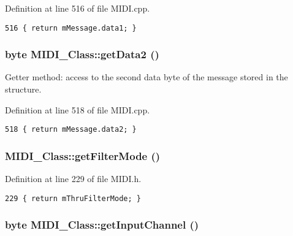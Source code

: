 Definition at line 516 of file MIDI.cpp.

\begin{Code}\begin{verbatim}516 { return mMessage.data1; }
\end{verbatim}
\end{Code}


\hypertarget{class_m_i_d_i___class_688f4f57142f1a7dfd1a79bf43e1b74d}{
\subsubsection[{getData2}]{\setlength{\rightskip}{0pt plus 5cm}byte MIDI\_\-Class::getData2 ()}}
\label{class_m_i_d_i___class_688f4f57142f1a7dfd1a79bf43e1b74d}


Getter method: access to the second data byte of the message stored in the structure. 

Definition at line 518 of file MIDI.cpp.

\begin{Code}\begin{verbatim}518 { return mMessage.data2; }
\end{verbatim}
\end{Code}


\hypertarget{class_m_i_d_i___class_8952fc757cefe98856ba7cfc811bbbb3}{
\subsubsection[{getFilterMode}]{ MIDI\_\-Class::getFilterMode ()}}
\label{class_m_i_d_i___class_8952fc757cefe98856ba7cfc811bbbb3}




Definition at line 229 of file MIDI.h.

\begin{Code}\begin{verbatim}229 { return mThruFilterMode; }
\end{verbatim}
\end{Code}


\hypertarget{class_m_i_d_i___class_f05fb3c0857d2f50d6c21414eb18ef53}{
\subsubsection[{getInputChannel}]{\setlength{\rightskip}{0pt plus 5cm}byte MIDI\_\-Class::getInputChannel ()}}
\label{class_m_i_d_i___class_f05fb3c0857d2f50d6c21414eb18ef53}




